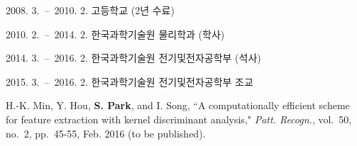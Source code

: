 \documentclass[master,english,draft,pdfdoc]{kaist-ucs}
\begin{document}
    \begin{education}
        \item[2008. 3.\ --\ 2010. 2.] 고등학교 (2년 수료)
        \item[2010. 2.\ --\ 2014. 2.] 한국과학기술원 물리학과 (학사)
        \item[2014. 3.\ --\ 2016. 2.] 한국과학기술원 전기및전자공학부 (석사)
    \end{education}

    \begin{career}
        \item[2015. 3.\ --\ 2016. 2.] 한국과학기술원 전기및전자공학부 조교
    \end{career}


    \begin{publication}
        \item H.-K. Min, Y. Hou, {\bf S. Park}, and I. Song,
``A computationally efficient scheme for feature extraction with kernel discriminant analysis,"
\textit{Patt. Recogn.}, vol.~50, no.~2, pp.~45-55, Feb. 2016 (to be published).
    \end{publication}

  \label{paperlastpagelabel}     %
\end{document}
